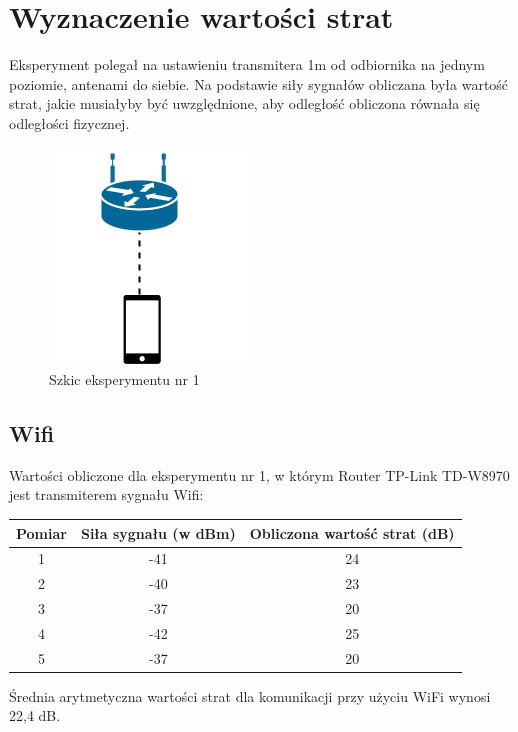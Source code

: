 \section{Wyznaczenie wartości strat}
Eksperyment polegał na ustawieniu transmitera 1m od odbiornika na jednym poziomie, antenami do siebie. Na podstawie siły sygnałów obliczana była wartość strat, jakie musiałyby być uwzględnione, aby odległość obliczona równała się odległości fizycznej.\\			
\begin{figure}[H]
	\centering			
	\caption{Szkic eksperymentu nr 1}
	\includegraphics{exper1}
\end{figure}
\subsection{Wifi}
	Wartości obliczone dla eksperymentu nr 1, w którym Router TP-Link TD-W8970 jest transmiterem sygnału Wifi:
	\begin{center}
		\begin{minipage}{\linewidth}
			\begin{tabular}{|c|c|c|}
				\hline 
				Pomiar & Siła sygnału (w dBm) & Obliczona wartość strat (dB) \\ 
				\hline 
				1 & -41 & 24 \\ 
				\hline 
				2 & -40 & 23 \\ 
				\hline 
				3 & -37 & 20 \\ 
				\hline 
				4 & -42 & 25 \\ 
				\hline 
				5 & -37 & 20 \\ 
				\hline 
			\end{tabular} 
		\end{minipage} 
	\end{center}
Średnia arytmetyczna wartości strat dla komunikacji przy użyciu WiFi wynosi 22,4 dB.
